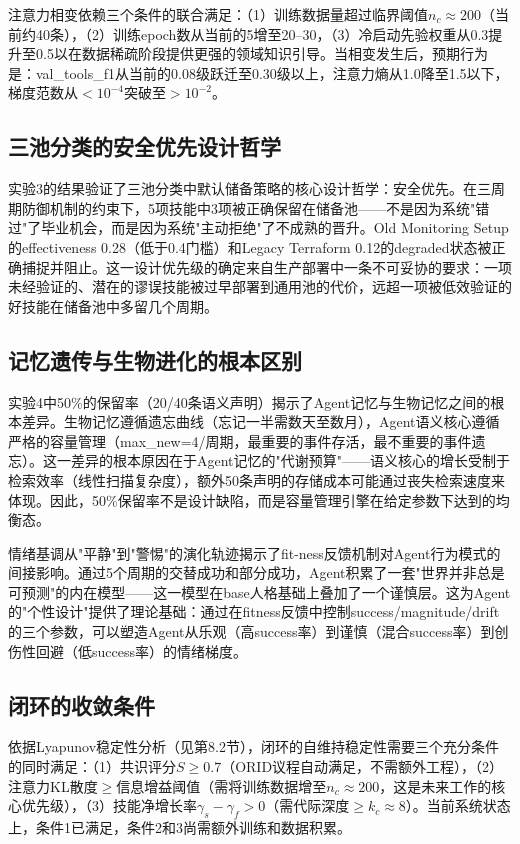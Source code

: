 \documentclass[12pt,a4paper]{ctexart}
\begin{document}
注意力相变依赖三个条件的联合满足：（1）训练数据量超过临界阈值$n_c \approx 200$（当前约40条），（2）训练epoch数从当前的5增至20--30，（3）冷启动先验权重从0.3提升至0.5以在数据稀疏阶段提供更强的领域知识引导。当相变发生后，预期行为是：val\_tools\_f1从当前的0.08级跃迁至0.30级以上，注意力熵从1.0降至1.5以下，梯度范数从$< 10^{-4}$突破至$> 10^{-2}$。

\subsection{三池分类的安全优先设计哲学}

实验3的结果验证了三池分类中默认储备策略的核心设计哲学：安全优先。在三周期防御机制的约束下，5项技能中3项被正确保留在储备池——不是因为系统"错过"了毕业机会，而是因为系统"主动拒绝"了不成熟的晋升。Old Monitoring Setup的effectiveness 0.28（低于0.4门槛）和Legacy Terraform 0.12的degraded状态被正确捕捉并阻止。这一设计优先级的确定来自生产部署中一条不可妥协的要求：一项未经验证的、潜在的谬误技能被过早部署到通用池的代价，远超一项被低效验证的好技能在储备池中多留几个周期。

\subsection{记忆遗传与生物进化的根本区别}

实验4中50\%的保留率（20/40条语义声明）揭示了Agent记忆与生物记忆之间的根本差异。生物记忆遵循遗忘曲线（忘记一半需数天至数月），Agent语义核心遵循严格的容量管理（max\_new=4/周期，最重要的事件存活，最不重要的事件遗忘）。这一差异的根本原因在于Agent记忆的"代谢预算"——语义核心的增长受制于检索效率（线性扫描复杂度），额外50条声明的存储成本可能通过丧失检索速度来体现。因此，50\%保留率不是设计缺陷，而是容量管理引擎在给定参数下达到的均衡态。

情绪基调从"平静"到"警惕"的演化轨迹揭示了fit-ness反馈机制对Agent行为模式的间接影响。通过5个周期的交替成功和部分成功，Agent积累了一套"世界并非总是可预测"的内在模型——这一模型在base人格基础上叠加了一个谨慎层。这为Agent的"个性设计"提供了理论基础：通过在fitness反馈中控制success/magnitude/drift的三个参数，可以塑造Agent从乐观（高success率）到谨慎（混合success率）到创伤性回避（低success率）的情绪梯度。

\subsection{闭环的收敛条件}

依据Lyapunov稳定性分析（见第8.2节），闭环的自维持稳定性需要三个充分条件的同时满足：（1）共识评分$S \geq 0.7$（ORID议程自动满足，不需额外工程），（2）注意力KL散度$\geq$信息增益阈值（需将训练数据增至$n_c \approx 200$，这是未来工作的核心优先级），（3）技能净增长率$\gamma_s - \gamma_f > 0$（需代际深度$\geq k_c \approx 8$）。当前系统状态上，条件1已满足，条件2和3尚需额外训练和数据积累。
\end{document}

